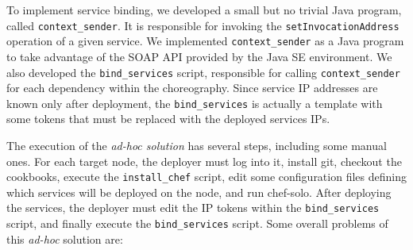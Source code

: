 To implement service binding,
we developed a small but no trivial Java program, called \texttt{context\_sender}. 
It is responsible for invoking the \texttt{setInvocationAddress} operation of a given service.
We implemented \texttt{context\_sender} as a Java program to take advantage of
the SOAP API provided by the Java SE environment.
We also developed the \texttt{bind\_services} script,
responsible for calling \texttt{context\_sender} for each dependency within the choreography.
Since service IP addresses are known only after deployment, the \texttt{bind\_services}
is actually a template with some tokens that must be replaced with the deployed services IPs.

The execution of the \emph{ad-hoc solution} has several steps, including some manual ones. 
For each target node, the deployer must log into it, install git, 
checkout the cookbooks, execute the \texttt{install\_chef} script, 
edit some configuration files defining which services will be deployed on the node,
and run chef-solo. 
After deploying the services, the deployer must edit the IP tokens
within the \texttt{bind\_services} script,
and finally execute the \texttt{bind\_services} script.
Some overall problems of this \emph{ad-hoc} solution are:


